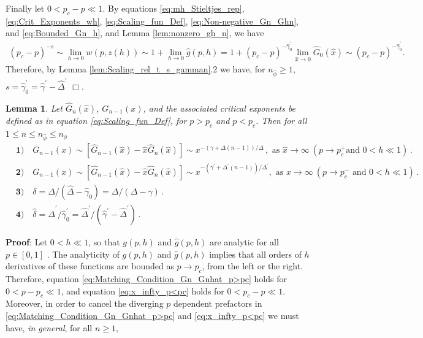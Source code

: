 \documentclass[english,12pt,jmp,graphicx]{revtex4-1}
\newtheorem{lemma}{Lemma}[section]
\newcommand{\ph}{\hat{\phi}}
\newcommand{\gh}{\hat{\gamma}}
\newcommand{\Dh}{\hat{\Delta}}
\newcommand{\dha}{\hat{\delta}}
\newcommand{\xh}{\hat{x}}
\begin{document}
Finally let $0<p_c-p\ll1$. By equations \eqref{eq:mh_Stieltjes_rep}, 
\eqref{eq:Crit_Exponents_wh}, \eqref{eq:Scaling_fun_Def},
\eqref{eq:Non-negative_Gn_Ghn}, and \eqref{eq:Bounded_Gn_h}, and  
Lemma \ref{lem:nonzero_gh_n},
we have
%
\begin{align*}
  (p_c-p)^{-s}\sim\lim_{h\to0}w(p,z(h))
           \sim1+\lim_{h\to0}\hat{g}(p,h)
           =1+(p_c-p)^{-\gh_0^\prime}\lim_{\xh\to0}\hat{G}_0(\xh)
           \sim(p_c-p)^{-\gh_0^\prime}. 
\end{align*}
%
Therefore, by Lemma \ref{lem:Scaling_rel_t_s_gamman}.2 we have, for $n_{\ph}\geq1$,
$s=\gh_0^\prime=\gh^\prime-\Dh^\prime$ $\Box$. 
%
 \begin{lemma}\label{lem:G_ghat_asymp_x_to_infty}
   Let $\hat{G}_n(\xh)$, $G_{n-1}(x)$, and the associated critical
   exponents be defined as in equation \eqref{eq:Scaling_fun_Def}, for
   $p>p_c$ and $p<p_c$. Then for all $1\leq n\leq n_{\ph}\leq n_\phi$ 
     \begin{align*}
    &\mathbf{1)} \quad G_{n-1}(x)\sim[\hat{G}_{n-1}(\xh)-\xh\hat{G}_n(\xh)]\sim
      x^{-(\gamma+\Delta(n-1))/\Delta}\,, \text{ as } \xh\to\infty \ (p\to p_c^+  \text{
        and }  0<h\ll1)\,.\\
    &\mathbf{2)} \quad G_{n-1}(x)\sim[\hat{G}_{n-1}(\xh)-\xh\hat{G}_n(\xh)]\sim
      x^{-(\gamma^\prime+\Delta^\prime(n-1))/\Delta^\prime},  \text{ as }  x\to\infty \ (p\to p_c^- 
      \text{ and }  0<h\ll1)\,.\\      
    &\mathbf{3)} \quad \delta=\Dh/(\Dh-\gh_0)=\Delta/(\Delta-\gamma)\,.\\
    &\mathbf{4)} \quad \dha=\Dh^\prime/\gh_0^\prime=\Dh^\prime/(\gh^\prime-\Dh^\prime)\,.
     \end{align*}
 \end{lemma}
%
\noindent \textbf{Proof}:
%
Let $0<h\ll1$, so that $g(p,h)$ and $\hat{g}(p,h)$ are analytic for
all $p\in[0,1]$ \cite{Golden:CMP-473}. The analyticity of $g(p,h)$ and
$\hat{g}(p,h)$ implies that all orders of $h$ derivatives of these
functions are bounded as $p\to p_c$, from the left or the
right. Therefore, equation \eqref{eq:Matching_Condition_Gn_Gnhat_p>pc}
holds for $0<p-p_c\ll1$, and equation \eqref{eq:x_infty_p<pc}
holds for $0<p_c-p\ll1$. Moreover, in order to cancel the diverging $p$
dependent prefactors in \eqref{eq:Matching_Condition_Gn_Gnhat_p>pc}
and \eqref{eq:x_infty_p<pc} we must have, \emph{in general}, for all $n\geq1$,  
\end{document}
